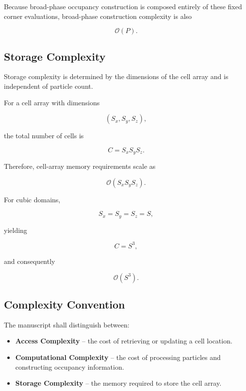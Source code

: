 Because broad-phase occupancy construction is composed entirely of these
fixed corner evaluations, broad-phase construction complexity is also

\begin{equation}
\mathcal{O}(P).
\end{equation}

\subsection{Storage Complexity}

Storage complexity is determined by the dimensions of the cell array and
is independent of particle count.

For a cell array with dimensions

\begin{equation}
(S_x,S_y,S_z),
\end{equation}

the total number of cells is

\begin{equation}
C=S_xS_yS_z.
\end{equation}

Therefore, cell-array memory requirements scale as

\begin{equation}
\mathcal{O}(S_xS_yS_z).
\end{equation}

For cubic domains,

\begin{equation}
S_x=S_y=S_z=S,
\end{equation}

yielding

\begin{equation}
C=S^3,
\end{equation}

and consequently

\begin{equation}
\mathcal{O}(S^3).
\end{equation}

\subsection{Complexity Convention}

The manuscript shall distinguish between:

\begin{itemize}
\item \textbf{Access Complexity} -- the cost of retrieving or updating a
cell location.
\item \textbf{Computational Complexity} -- the cost of processing
particles and constructing occupancy information.
\item \textbf{Storage Complexity} -- the memory required to store the
cell array.
\end{itemize}

